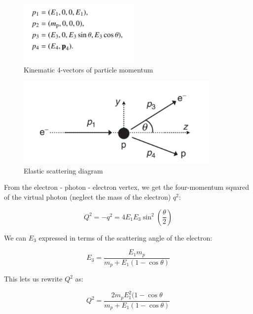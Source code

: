         \begin{figure}[H]
            \centering
            \includegraphics[width=6cm]{NuclearPhysics/modules/lepton-scattering/pics/elastic-ep/kine-e-1.PNG}
            \caption{Kinematic 4-vectors of particle momentum}
        \end{figure}
        
        \begin{figure}[H]
            \centering
            \includegraphics[width=10cm]{NuclearPhysics/modules/lepton-scattering/pics/elastic-ep/kine-e-2.PNG}
            \caption{Elastic scattering diagram}
        \end{figure}
        
        From the electron - photon - electron vertex, we get the four-momentum squared of the virtual photon (neglect the mass of the electron) $q^2$:
        
        \begin{equation}
            Q^2 = -q^2 = 4E_1E_3\sin^2(\frac{\theta}{2})
        \end{equation}
        
         We can $E_3$ expressed in terms of the scattering angle of the electron:
         
        \begin{equation}
            E_3 = \frac{E_1m_p}{m_p+E_1(1-\cos\theta)}
        \end{equation}
        
        This lets us rewrite $Q^2$ as:
        
        \begin{equation}
            Q^2 = \frac{2m_pE_1^2(1-\cos\theta}{m_p+E_1(1-\cos\theta)}\label{eq:2}
        \end{equation}
        
